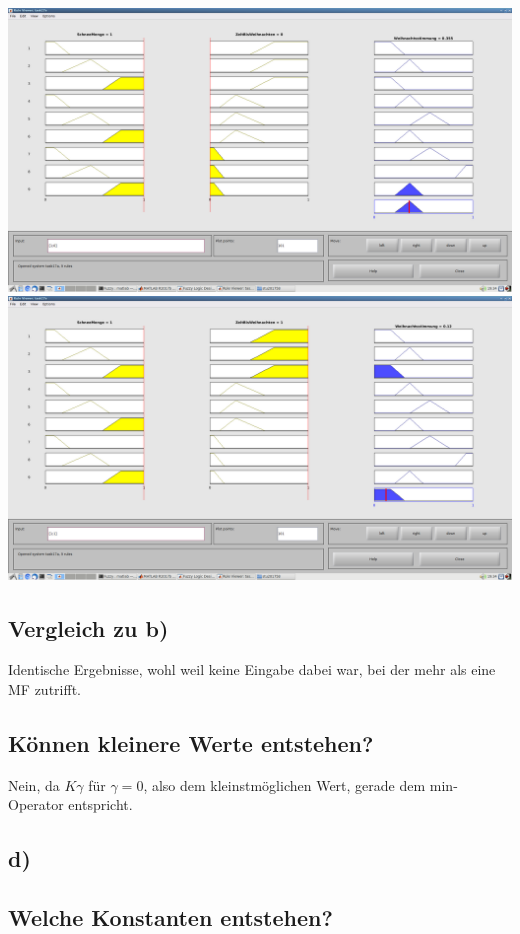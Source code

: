 \includegraphics[width=\textwidth]{part/screenshots/fuzzy-17c-K08-1-0}
\includegraphics[width=\textwidth]{part/screenshots/fuzzy-17c-K08-1-1}

\subsection*{Vergleich zu b)}

Identische Ergebnisse, wohl weil keine Eingabe dabei war, bei der mehr als eine MF zutrifft.

\subsection*{Können kleinere Werte entstehen?}
Nein, da $K \gamma$ für $\gamma = 0$, also dem kleinstmöglichen Wert, gerade dem min-Operator entspricht.
\subsection*{d)}

\subsection*{Welche Konstanten entstehen?}

